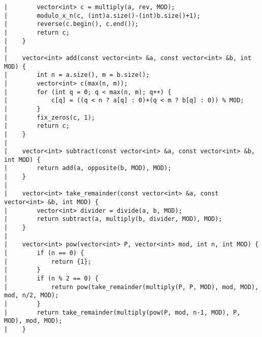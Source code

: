 \documentclass[a4paper, 10pt]{article}
\begin{document}
\begin{center}
\begin{verbatim}
|        vector<int> c = multiply(a, rev, MOD);
|        modulo_x_n(c, (int)a.size()-(int)b.size()+1);
|        reverse(c.begin(), c.end());
|        return c;
|    }
|    
|    vector<int> add(const vector<int> &a, const vector<int> &b, int MOD) {
|        int n = a.size(), m = b.size();
|        vector<int> c(max(n, m));
|        for (int q = 0; q < max(n, m); q++) {
|            c[q] = ((q < n ? a[q] : 0)+(q < m ? b[q] : 0)) % MOD;
|        }
|        fix_zeros(c, 1);
|        return c;
|    }
|    
|    vector<int> subtract(const vector<int> &a, const vector<int> &b, int MOD) {
|        return add(a, opposite(b, MOD), MOD);
|    }
|    
|    vector<int> take_remainder(const vector<int> &a, const vector<int> &b, int MOD) {
|        vector<int> divider = divide(a, b, MOD);
|        return subtract(a, multiply(b, divider, MOD), MOD);
|    }
|    
|    vector<int> pow(vector<int> P, vector<int> mod, int n, int MOD) {
|        if (n == 0) {
|            return {1};
|        }
|        if (n % 2 == 0) {
|            return pow(take_remainder(multiply(P, P, MOD), mod, MOD), mod, n/2, MOD);
|        }
|        return take_remainder(multiply(pow(P, mod, n-1, MOD), P, MOD), mod, MOD);
|    }
\end{verbatim}


\end{center}
\end{document}
